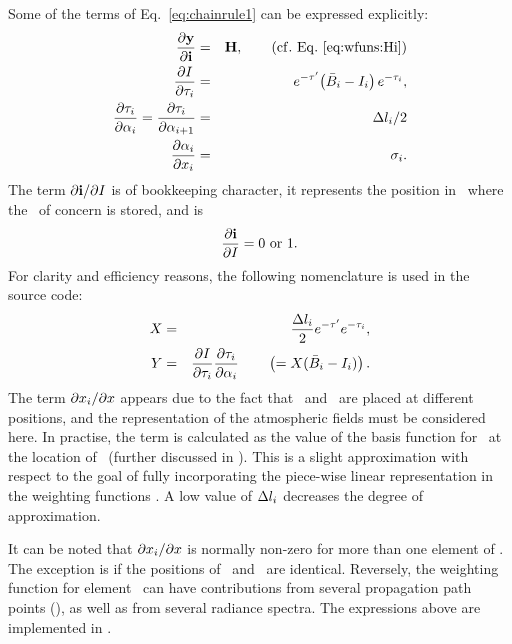 Some of the terms of Eq.~\ref{eq:chainrule1} can be expressed explicitly:
\begin{eqnarray}
  \frac{\partial \mathbf{y}}{\partial\mathbf{i}} 
      &=& \mathbf{H}, \qquad \mathrm{(cf.\ Eq.\ \ref{eq:wfuns:Hi})} \\
  \frac{\partial I}{\partial\tau_{i}} 
      &=& e^{-\tau'}\!\left(\bar{B}_i-I_{i}\right)e^{-\tau_{i}}, \\
  \frac{\partial\tau_{i}}{\partial{\alpha}_{i}}=
  \frac{\partial\tau_{i}}{\partial{\alpha}_{i+1}} 
      &=& \Delta l_{i}/2\\
  \frac{\partial{\alpha}_{i}}{\partial x_{i}}
      &=& \sigma_i.
\end{eqnarray}
The term $\partial\mathbf{i}
/ \partial I$ is of bookkeeping character, it represents the position in
\MpiVct\ where the \StoI\ of concern is stored, and is
\begin{equation}
  \frac{\PartD\MpiVct}{\PartD\StoI} = 0\ \mathrm{or}\ 1.
\end{equation}
For clarity and efficiency reasons, the following nomenclature is used in the
source code:
\begin{eqnarray}
  X &=& \frac{\Delta l_{i}}{2} e^{-\tau'} e^{-\tau_{i}}, \\
  Y &=& \frac{\partial I}{\partial\tau_{i}}
        \frac{\partial\tau_{i}}{\partial{\alpha}_{i}}
    \qquad \left( = X(\bar{B}_i-I_{i}) \right).
\end{eqnarray}
The term $\partial x_{i}/\partial x$ appears due to the fact that
\ and \SttElm\ are placed at different positions, and the
representation of the atmospheric fields must be considered here. In practise,
the term is calculated as the value of the basis function for \SttElm\ at the
location of \ (further discussed in \citet{buehler:artst:05}). This
is a slight approximation with respect to the goal of fully incorporating the
piece-wise linear representation in the weighting functions
\citep{buehler:artst:05}. A low value of $\Delta l_{i}$ decreases the
degree of approximation.

It can be noted that $\partial x_{i} / \partial x$ is normally non-zero
for more than one element of \SttVct. The exception is if the positions of
\ and \SttElm\ are identical. Reversely, the weighting function for
element \SttElm\ can have contributions from several propagation path points
(), as well as from several radiance spectra. The expressions above
are implemented in .

